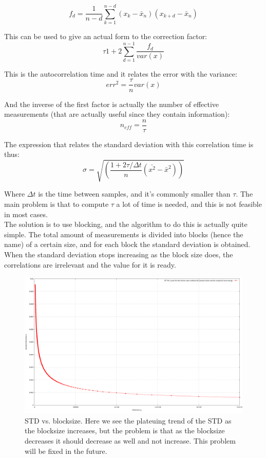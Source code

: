 \documentclass[11pt]{article}
\begin{document}
\[
f_d=\frac{1}{n-d}\sum_{k=1}^{n-d}{\left(x_k-\bar{x}_n\right)\left(x_{k+d}-\bar{x}_n\right)}
\]

This can be used to give an actual form to the correction factor:\\

\[
\tau1+2\sum_{d=1}^{n-1}{\frac{f_d}{var\left(x\right)}}
\]

This is the autocorrelation time and it relates the error with the variance:\\

\[
err^2=\frac{\tau}{n}var\left(x\right)
\]

And the inverse of the first factor is actually the number of effective measurements (that are actually useful since they contain information):\\

\[
n_{eff}=\frac{n}{\tau}
\]

The expression that relates the standard deviation with this correlation time is thus:\\

\[
\sigma=\sqrt{\left(\frac{1+2\tau/\Delta t}{n}\left(\bar{x^2}-\bar{x}^2\right)\right)}
\]

Where $\Delta t$ is the time between samples, and it's commonly smaller than $\tau$. The main problem is that to compute $\tau$ a lot of time is needed, and this is not feasible in most cases.\\

			The solution is to use blocking, and the algorithm to do this is actually quite simple. The total amount of measurements is divided into blocks (hence the name) of a certain size, and for each block the standard deviation is obtained. When the standard deviation stops increasing as the block size does, the correlations are irrelevant and the value for it is ready.\\


			\begin{figure}
\centering \includegraphics[width=0.45\linewidth]{figures/blockingheliumsimpleandalytical}
\protect\caption{STD vs. blocksize. Here we see the plateuing trend of the STD as the blocksize increases, but the problem is that as the blocksize decreases it should decrease as well and not increase. This problem will be fixed in the future.}
\label{fig01:alpha_Simple} 
\end{figure}
\end{document}
